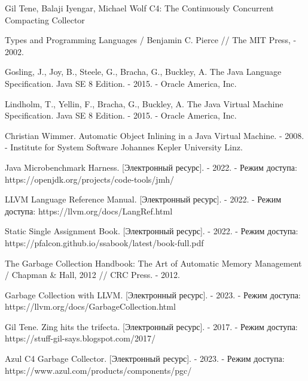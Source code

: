 \begingroup 
\renewcommand{\section}[2]{\anonsection{Библиографический список}}
\begin{flushleft}
\begin{thebibliography}{}

Gil Tene, Balaji Iyengar, Michael Wolf C4: The Continuously Concurrent Compacting Collector

Types and Programming Languages / Benjamin C. Pierce // The MIT Press, - 2002.

Gosling, J., Joy, B., Steele, G., Bracha, G., Buckley, A. The Java Language
Specification. Java SE 8 Edition. - 2015. - Oracle America, Inc.

Lindholm, T., Yellin, F., Bracha, G., Buckley, A. The Java Virtual Machine
Specification. Java SE 8 Edition. - 2015. - Oracle America, Inc.
	
Christian Wimmer. Automatic Object Inlining in a Java Virtual Machine. - 2008. - Institute for System Software
Johannes Kepler University Linz.

Java Microbenchmark Harness. [Электронный ресурс]. - 2022. - Режим доступа: https://openjdk.org/projects/code-tools/jmh/
	
LLVM Language Reference Manual. [Электронный ресурс]. - 2022. - Режим доступа: https://llvm.org/docs/LangRef.html
	
Static Single Assignment Book. [Электронный ресурс]. - 2022. - Режим доступа: https://pfalcon.github.io/ssabook/latest/book-full.pdf
	
The Garbage Collection Handbook: The Art of Automatic Memory Management / Chapman \& Hall, 2012 // CRC Press. - 2012.
	
Garbage Collection with LLVM. [Электронный ресурс]. - 2023. - Режим доступа: https://llvm.org/docs/GarbageCollection.html
	
Gil Tene. Zing hits the trifecta. [Электронный ресурс]. - 2017. - Режим доступа: https://stuff-gil-says.blogspot.com/2017/

Azul C4 Garbage Collector. [Электронный ресурс]. - 2023. - Режим доступа: https://www.azul.com/products/components/pgc/


\end{thebibliography}
\end{flushleft}
